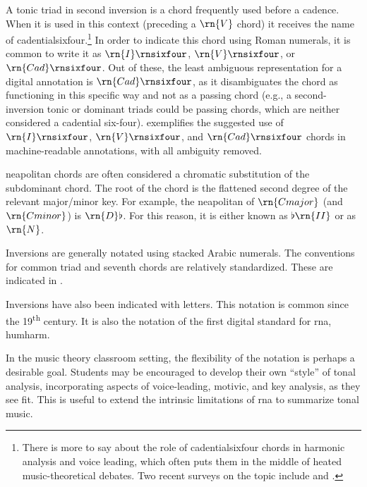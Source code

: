 A tonic triad in second inversion is a chord frequently used
before a cadence. When it is used in this context (preceding
a $\rn{V}$ chord) it receives the name of
\gls{cadentialsixfour}.\footnote{There is more to say about
the role of \gls{cadentialsixfour} chords in harmonic
analysis and voice leading, which often puts them in the
middle of heated music-theoretical debates. Two recent
surveys on the topic include \textcite{mirka2015mystery} and
\textcite{ninov2016functional}.} In order to indicate this
chord using Roman numerals, it is common to write it as
$\rn{I}\rnsixfour$, $\rn{V}\rnsixfour$, or
$\rn{Cad}\rnsixfour$. Out of these, the least ambiguous
representation for a digital annotation is
$\rn{Cad}\rnsixfour$, as it disambiguates the chord as
functioning in this specific way and not as a passing chord
(e.g., a second-inversion tonic or dominant triads could be
passing chords, which are neither considered a cadential
six-four).  exemplifies the
suggested use of $\rn{I}\rnsixfour$, $\rn{V}\rnsixfour$, and
$\rn{Cad}\rnsixfour$ chords in machine-readable annotations,
with all ambiguity removed.


\gls{neapolitan} chords are often considered a chromatic
substitution of the subdominant chord. The root of the chord
is the flattened second degree of the relevant major/minor
key. For example, the \gls{neapolitan} of $\rn{C major}$
(and $\rn{C minor}$) is $\rn{D}\flat$. For this reason, it
is either known as $\flat\rn{II}$ or as $\rn{N}$.

Inversions are generally notated using stacked Arabic
numerals. The conventions for common triad and seventh
chords are relatively standardized. These are indicated in
.


Inversions have also been indicated with letters. This
notation is common since the 19\textsuperscript{th} century.
It is also the notation of the first digital standard for
\gls{rna}, \gls{humharm}.

In the music theory classroom setting, the flexibility of
the notation is perhaps a desirable goal. Students may be
encouraged to develop their own ``style'' of tonal analysis,
incorporating aspects of voice-leading, motivic, and key
analysis, as they see fit. This is useful to extend the
intrinsic limitations of \gls{rna} to summarize tonal music.

